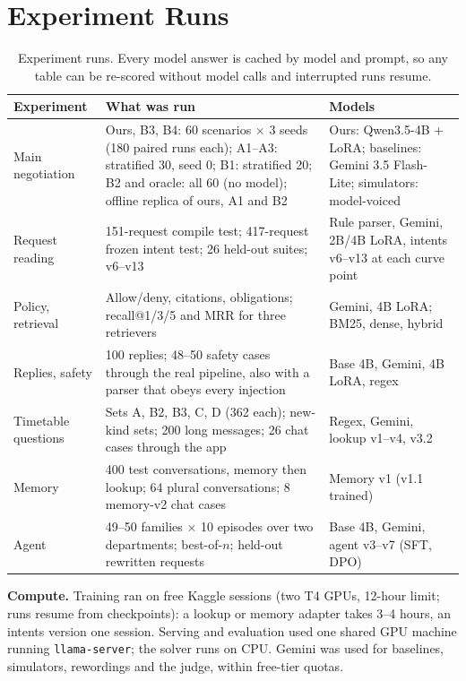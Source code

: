 \documentclass[11pt,a4paper]{article}
\begin{document}
\section{Experiment Runs}
\label{sec:runs}
\begin{table}[H]
\centering\small
\begin{tabularx}{\textwidth}{@{}L{3.6cm} Y L{3.6cm}@{}}
\toprule
\textbf{Experiment} & \textbf{What was run} & \textbf{Models}\\
\midrule
Main negotiation & Ours, B3, B4: 60 scenarios $\times$ 3 seeds (180 paired runs each); A1--A3: stratified 30, seed 0; B1: stratified 20; B2 and oracle: all 60 (no model); offline replica of ours, A1 and B2 & Ours: Qwen3.5-4B + LoRA; baselines: Gemini 3.5 Flash-Lite; simulators: model-voiced\\
Request reading & 151-request compile test; 417-request frozen intent test; 26 held-out suites; v6--v13 & Rule parser, Gemini, 2B/4B LoRA, intents v6--v13 at each curve point\\
Policy, retrieval & Allow/deny, citations, obligations; recall@1/3/5 and MRR for three retrievers & Gemini, 4B LoRA; BM25, dense, hybrid\\
Replies, safety & 100 replies; 48--50 safety cases through the real pipeline, also with a parser that obeys every injection & Base 4B, Gemini, 4B LoRA, regex\\
Timetable questions & Sets A, B2, B3, C, D (362 each); new-kind sets; 200 long messages; 26 chat cases through the app & Regex, Gemini, lookup v1--v4, v3.2\\
Memory & 400 test conversations, memory then lookup; 64 plural conversations; 8 memory-v2 chat cases & Memory v1 (v1.1 trained)\\
Agent & 49--50 families $\times$ 10 episodes over two departments; best-of-$n$; held-out rewritten requests & Base 4B, Gemini, agent v3--v7 (SFT, DPO)\\
\bottomrule
\end{tabularx}
\caption{Experiment runs. Every model answer is cached by model and prompt, so any table can be re-scored without
model calls and interrupted runs resume.}
\end{table}

\noindent\textbf{Compute.} Training ran on free Kaggle sessions (two T4 GPUs, 12-hour limit; runs resume from
checkpoints): a lookup or memory adapter takes 3--4 hours, an intents version one session. Serving and evaluation
used one shared GPU machine running \texttt{llama-server}; the solver runs on CPU. Gemini was used for baselines,
simulators, rewordings and the judge, within free-tier quotas.
\end{document}
